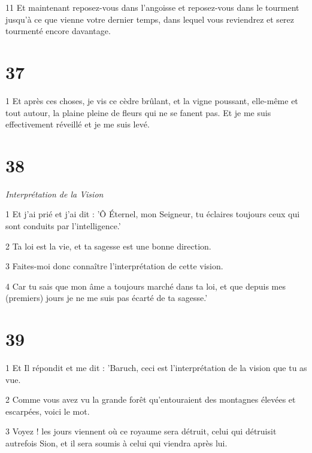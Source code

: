 \par 11 Et maintenant reposez-vous dans l'angoisse et reposez-vous dans le tourment jusqu'à ce que vienne votre dernier temps, dans lequel vous reviendrez et serez tourmenté encore davantage.

\chapter{37}

\par 1 Et après ces choses, je vis ce cèdre brûlant, et la vigne poussant, elle-même et tout autour, la plaine pleine de fleurs qui ne se fanent pas. Et je me suis effectivement réveillé et je me suis levé.

\chapter{38}

\par \textit{Interprétation de la Vision}

\par 1 Et j'ai prié et j'ai dit : 'Ô Éternel, mon Seigneur, tu éclaires toujours ceux qui sont conduits par l'intelligence.'

\par 2 Ta loi est la vie, et ta sagesse est une bonne direction.

\par 3 Faites-moi donc connaître l'interprétation de cette vision.

\par 4 Car tu sais que mon âme a toujours marché dans ta loi, et que depuis mes (premiers) jours je ne me suis pas écarté de ta sagesse.'

\chapter{39}

\par 1 Et Il répondit et me dit : 'Baruch, ceci est l'interprétation de la vision que tu as vue.

\par 2 Comme vous avez vu la grande forêt qu'entouraient des montagnes élevées et escarpées, voici le mot.

\par 3 Voyez ! les jours viennent où ce royaume sera détruit, celui qui détruisit autrefois Sion, et il sera soumis à celui qui viendra après lui.

